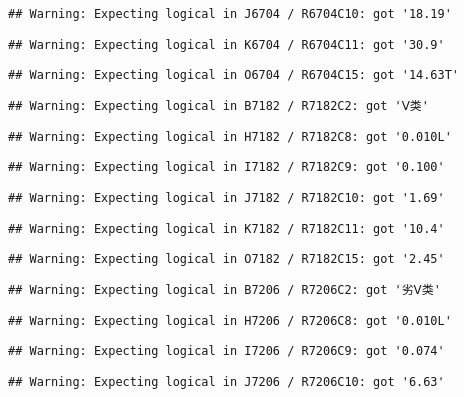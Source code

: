 \documentclass[
]{article}
\begin{document}
\begin{verbatim}
## Warning: Expecting logical in J6704 / R6704C10: got '18.19'
\end{verbatim}

\begin{verbatim}
## Warning: Expecting logical in K6704 / R6704C11: got '30.9'
\end{verbatim}

\begin{verbatim}
## Warning: Expecting logical in O6704 / R6704C15: got '14.63T'
\end{verbatim}

\begin{verbatim}
## Warning: Expecting logical in B7182 / R7182C2: got 'Ⅴ类'
\end{verbatim}

\begin{verbatim}
## Warning: Expecting logical in H7182 / R7182C8: got '0.010L'
\end{verbatim}

\begin{verbatim}
## Warning: Expecting logical in I7182 / R7182C9: got '0.100'
\end{verbatim}

\begin{verbatim}
## Warning: Expecting logical in J7182 / R7182C10: got '1.69'
\end{verbatim}

\begin{verbatim}
## Warning: Expecting logical in K7182 / R7182C11: got '10.4'
\end{verbatim}

\begin{verbatim}
## Warning: Expecting logical in O7182 / R7182C15: got '2.45'
\end{verbatim}

\begin{verbatim}
## Warning: Expecting logical in B7206 / R7206C2: got '劣Ⅴ类'
\end{verbatim}

\begin{verbatim}
## Warning: Expecting logical in H7206 / R7206C8: got '0.010L'
\end{verbatim}

\begin{verbatim}
## Warning: Expecting logical in I7206 / R7206C9: got '0.074'
\end{verbatim}

\begin{verbatim}
## Warning: Expecting logical in J7206 / R7206C10: got '6.63'
\end{verbatim}
\end{document}
